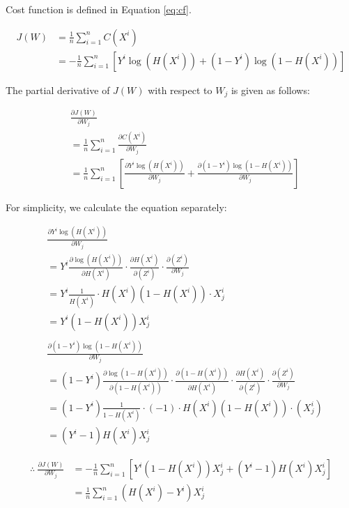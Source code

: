 \documentclass[conference]{IEEEtran}
\begin{document}
Cost function is defined in Equation \eqref{eq:cf}.

\begin{equation}
\label{eq:cf}
	\begin{aligned}
	J(W)&=\frac{1}{n}\sum_{i=1}^{n}C(X^{i})\\
		&=-\frac{1}{n}\sum_{i=1}^{n}[Y^{i}\log{(H(X^{i}))}+(1-Y^{i})\log{(1-H(X^{i}))}]
	\end{aligned}
\end{equation}

The partial derivative of $J(W)$ with respect to $W_{j}$ is given as follows:

\begin{align*}
	&\frac{\partial{J(W)}}{\partial{W_{j}}}\\
	&=\frac{1}{n}\sum_{i=1}^{n}\frac{\partial{C(X^{i})}}{\partial{W_{j}}}\\
	&=\frac{1}{n}\sum_{i=1}^{n}[\frac{\partial{Y^{i}\log{(H(X^{i}))}}}{\partial{W_{j}}}+\frac{\partial{(1-Y^{i})\log{(1-H(X^{i}))}}}{\partial{W_{j}}}]
\end{align*}

For simplicity, we calculate the equation separately:

\begin{align*}
	&\frac{\partial{Y^{i}\log{(H(X^{i}))}}}{\partial{W_{j}}}\\
	&=Y^{i}\frac{\partial{\log{(H(X^{i}))}}}{\partial{H(X^{i})}}\cdot \frac{\partial{H(X^{i})}}{\partial{(Z^{i})}}\cdot \frac{\partial{(Z^{i})}}{\partial{W_{j}}}\\
	&=Y^{i}\frac{1}{H(X^{i})}\cdot H(X^{i})(1-H(X^{i}))\cdot X^{i}_{j}\\
	&=Y^{i}(1-H(X^{i}))X^{i}_{j}\\
	\\
	&\frac{\partial{(1-Y^{i})\log{(1-H(X^{i}))}}}{\partial{W_{j}}}\\
	&=(1-Y^{i})\frac{\partial{\log{(1-H(X^{i}))}}}{\partial{(1-H(X^{i}))}}\cdot \frac{\partial{(1-H(X^{i}))}}{\partial{H(X^{i})}} \cdot \frac{\partial{H(X^{i})}}{\partial{(Z^{i})}}\cdot \frac{\partial{(Z^{i})}}{\partial{W_{j}}}\\
	&=(1-Y^{i})\frac{1}{1-H(X^{i})}\cdot (-1)\cdot H(X^{i})(1-H(X^{i}))\cdot (X^{i}_{j})\\
	&=(Y^{i}-1)H(X^{i})X^{i}_{j}
\end{align*}

\begin{align*}
	\therefore~
	\frac{\partial{J(W)}}{\partial{W_{j}}}
	&=-\frac{1}{n}\sum_{i=1}^{n}[Y^{i}(1-H(X^{i}))X^{i}_{j}+(Y^{i}-1)H(X^{i})X^{i}_{j}]\\
	&=\frac{1}{n}\sum_{i=1}^{n}(H(X^{i})-Y^{i})X^{i}_{j}
\end{align*}
\end{document}
